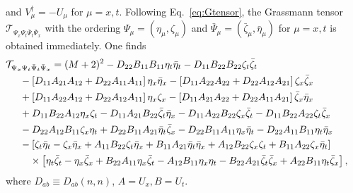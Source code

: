 and $V_{\mu}^{\dagger}=-U_{\mu}$ for $\mu=x,t$. Following Eq.~\eqref{eq:Gtensor}, the Grassmann tensor $\mathcal{T}_{\Psi_x\Psi_t\bar{\Psi}_t\bar{\Psi}_x}$ with the ordering $\Psi_\mu=(\eta_{\mu},\zeta_{\mu})$ and $\bar{\Psi}_{\mu}=(\bar{\zeta}_{\mu},\bar{\eta}_{\mu})$ for $\mu=x,t$ is obtained immediately. One finds
\begin{align}
\label{eq:explicit}
	&\hspace{-5mm} \mathcal{T}_{\Psi_x\Psi_t\bar{\Psi}_t\bar{\Psi}_x} %
	=(M+2)^2 -D_{22} B_{11} B_{11}\eta_{t}\bar{\eta}_{t}
	-D_{11} B_{22} B_{22}\zeta_{t}\bar{\zeta}_{t} 
	\nonumber \\
	&
	-\left[
	D_{11} A_{21} A_{12}
	+D_{22} A_{11} A_{11}
	\right]\eta_{x}\bar{\eta}_{x} 
	-\left[
	D_{11} A_{22} A_{22}
	+D_{22}  A_{12} A_{21}
	\right]\zeta_{x}\bar{\zeta}_{x}\nonumber\\
	&
	+\left[
	D_{11} A_{22} A_{12} + D_{22} A_{12} A_{11}
	\right]\eta_{x}\zeta_{x} %
	- \left[
	D_{11} A_{21} A_{22}+D_{22} A_{11} A_{21}
	\right]\bar{\zeta}_{x}\bar{\eta}_{x}\nonumber\\
	&+D_{11} B_{22} A_{12}\eta_{x}\zeta_{t}
	- D_{11} A_{21} B_{22}\bar{\zeta}_{t}\bar{\eta}_{x} %
	-D_{11} A_{22} B_{22}\zeta_{x}\bar{\zeta}_{t}
	-D_{11} B_{22} A_{22}\zeta_{t}\bar{\zeta}_{x}\nonumber\\
	& -D_{22} A_{12} B_{11}\zeta_{x}\eta_{t}
	+D_{22} B_{11} A_{21}\bar{\eta}_{t}\bar{\zeta}_{x} %
	-D_{22} B_{11} A_{11}\eta_{x}\bar{\eta}_{t}
	-D_{22} A_{11} B_{11}\eta_{t}\bar{\eta}_{x}\nonumber\\
	&-\left[
	\zeta_{t}\bar{\eta}_{t}-\zeta_{x}\bar{\eta}_{x}
	+A_{11} B_{22}\zeta_{t}\bar{\eta}_{x}
	+B_{11} A_{21}\bar{\eta}_{t}\bar{\eta}_{x} %
	+A_{12} B_{22}\zeta_{x}\zeta_{t}
	+B_{11} A_{22}\zeta_{x}\bar{\eta}_{t}
	\right]\nonumber\\
	&\quad\times\left[
	\eta_{t}\bar{\zeta}_{t}-\eta_{x}\bar{\zeta}_{x}
	+ B_{22} A_{11}\eta_{x}\bar{\zeta}_{t}
	-A_{12} B_{11}\eta_{x}\eta_{t} %
	-B_{22} A_{21}\bar{\zeta}_{t}\bar{\zeta}_{x}
	+A_{22} B_{11}\eta_{t}\bar{\zeta}_{x}
	\right], 
\end{align}
where $D_{ab}\equiv D_{ab}(n,n)$,  $A=U_x,B=U_t$. 














